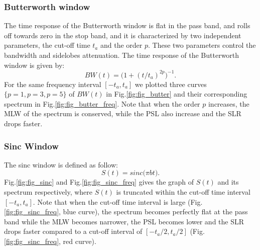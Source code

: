 \documentclass[useAMS,usenatbib]{mn2e}
\begin{document}
\subsubsection{Butterworth window}
The time response of the Butterworth window is flat  in the pass band, and rolls off towards zero in the stop band, and it is 
characterized by two independent parameters, the cut-off time $t_a$ and the order $p$. These two parameters control the 
bandwidth and sidelobes  attenuation. The time response of the Butterworth window is given by:
\begin{equation}
BW(t)= \Big(1 + (t/t_a)^{2p}\Big)^{-1}.
\end{equation}
For the same frequency interval $[-t_a,t_a]$ we plotted  three curves $\{p=1, p=3, p=5\}$ of $BW(t)$ in Fig.\ref{fig:fig_butter} and 
their corresponding spectrum in Fig.\ref{fig:fig_butter_freq}. Note that when the order $p$ increases, the MLW of the 
spectrum is conserved, while the PSL also increase and the SLR drops faster.
\subsubsection{Sinc Window}
The sinc window is defined as follow:
\begin{equation}
S(t)= sinc\big(\pi b t\big).
\end{equation}
 Fig.\ref{fig:fig_sinc} and Fig.\ref{fig:fig_sinc_freq} gives the graph of $S(t)$ and its spectrum respectively, where 
$S(t)$ is truncated within the cut-off time interval $[-t_a,t_a]$. Note that when the cut-off time interval is large 
(Fig.\ref{fig:fig_sinc_freq}, blue curve), the spectrum becomes perfectly flat at the pass band while the MLW becomes narrower,  the PSL 
becomes lower and the SLR drops faster compared to a cut-off interval of $[-t_a/2,t_a/2]$ (Fig.\ref{fig:fig_sinc_freq}, red curve). 
\end{document}

